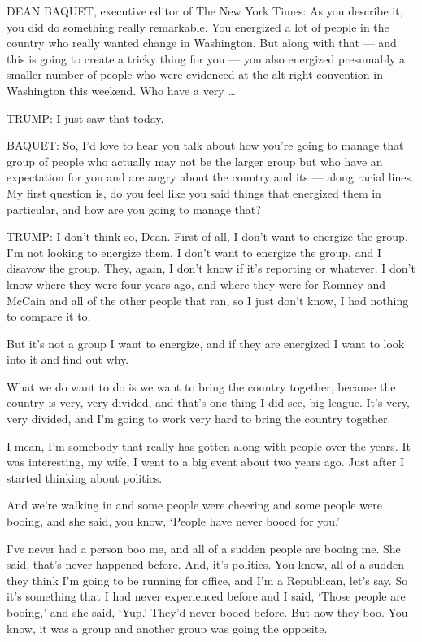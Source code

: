 DEAN BAQUET, executive editor of The New York Times: As you describe it,
you did do something really remarkable. You energized a lot of people in
the country who really wanted change in Washington. But along with that
--- and this is going to create a tricky thing for you --- you also
energized presumably a smaller number of people who were evidenced at
the alt-right convention in Washington this weekend. Who have a very
\ldots{}

TRUMP: I just saw that today.

BAQUET: So, I'd love to hear you talk about how you're going to manage
that group of people who actually may not be the larger group but who
have an expectation for you and are angry about the country and its ---
along racial lines. My first question is, do you feel like you said
things that energized them in particular, and how are you going to
manage that?

TRUMP: I don't think so, Dean. First of all, I don't want to energize
the group. I'm not looking to energize them. I don't want to energize
the group, and I disavow the group. They, again, I don't know if it's
reporting or whatever. I don't know where they were four years ago, and
where they were for Romney and McCain and all of the other people that
ran, so I just don't know, I had nothing to compare it to.

But it's not a group I want to energize, and if they are energized I
want to look into it and find out why.

What we do want to do is we want to bring the country together, because
the country is very, very divided, and that's one thing I did see, big
league. It's very, very divided, and I'm going to work very hard to
bring the country together.

I mean, I'm somebody that really has gotten along with people over the
years. It was interesting, my wife, I went to a big event about two
years ago. Just after I started thinking about politics.

And we're walking in and some people were cheering and some people were
booing, and she said, you know, `People have never booed for you.'

I've never had a person boo me, and all of a sudden people are booing
me. She said, that's never happened before. And, it's politics. You
know, all of a sudden they think I'm going to be running for office, and
I'm a Republican, let's say. So it's something that I had never
experienced before and I said, `Those people are booing,' and she said,
`Yup.' They'd never booed before. But now they boo. You know, it was a
group and another group was going the opposite.

